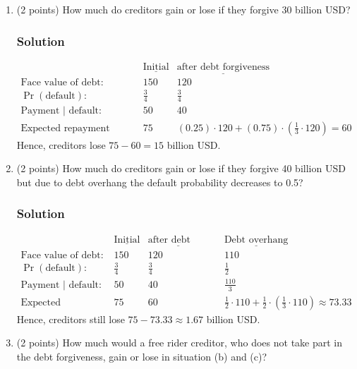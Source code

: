 \documentclass[12pt]{article}
\begin{document}
\begin{enumerate}
\begin{enumerate}
        \item (2 points) How much do creditors gain or lose if they forgive 30 billion USD?
        \subsubsection*{Solution}

        \begin{align*}
            & \underline{\text{Initial}} & \underline{\text{after debt forgiveness}}
            \\ \text{Face value of debt: }  & 150 & 120
            \\ \Pr(\text{default}):\        & \frac{3}{4} & \frac{3}{4}
            \\ \text{Payment | default: }   & 50 & 40
            \\ \text{Expected repayment value: } & 75 &(0.25)\cdot120+(0.75)\cdot\left(\frac{1}{3}\cdot120\right)= 60
        \end{align*}
        Hence, creditors lose $75 - 60 = 15$ billion USD. 

        \item (2 points) How much do creditors gain or lose if they forgive 40 billion USD but due to debt overhang the default probability decreases to 0.5?
        \subsubsection*{Solution}

        \begin{align*}
            & \underline{\text{Initial}} & \underline{\text{after debt forgiveness}}
            && \underline{\text{Debt overhang}}
            \\ \text{Face value of debt: }  & 150 & 120 && 110 
            \\ \Pr(\text{default}):\        & \frac{3}{4} & \frac{3}{4} && \frac{1}{2}
            \\ \text{Payment | default: }   & 50 & 40 && \frac{110}{3}
            \\ \text{Expected repayment value: } & 75 &60 && \frac{1}{2}\cdot110+\frac{1}{2}\cdot\left(\frac{1}{3}\cdot110\right) \approx 73.33 
        \end{align*}
        Hence, creditors still lose $75 - 73.33 \approx 1.67$ billion USD. 

        \item (2 points) How much would a free rider creditor, who does not take part in the debt forgiveness, gain or lose in situation (b) and (c)?

\end{enumerate}
\end{enumerate}
\end{document}
